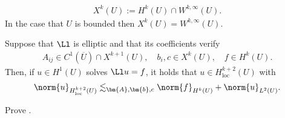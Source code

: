 \documentclass[
    a4paper,
    DIV=14,
    abstract=true,
    numbers=noenddot
]{scrartcl}
\begin{document}
\begin{align*}
    X^k(U):= H^k(U) \cap W^{k,\infty}(U).
\end{align*}
In the case that $U$ is bounded then $X^k(U)=W^{k,\infty}(U)$.
\begin{theorem}\label{higher regularity 2}
    Suppose that $\Ll $ is elliptic and that its coefficients verify
    \begin{align*}
        A_{ij} \in C^{1}(\overline{U} )\cap X^{k+1}(U), \quad b_i,c \in X^k(U), \quad f \in H^k(U).
    \end{align*}
    Then, if $u \in H^1(U)$ solves $\Ll u=f$, it holds that $u \in H^{k+2}_{\mathrm{loc}} (U)$ with
    \begin{align*}
        \norm{u}_{H ^{k+2}_{\mathrm{loc}} (U)} \lesssim_{\bm{A},\bm{b},c} \norm{f}_{H^k(U)}+\norm{u}_{L^2(U)}.
    \end{align*}
\end{theorem}
\begin{exercise}
    Prove .
\end{exercise}
\end{document}
